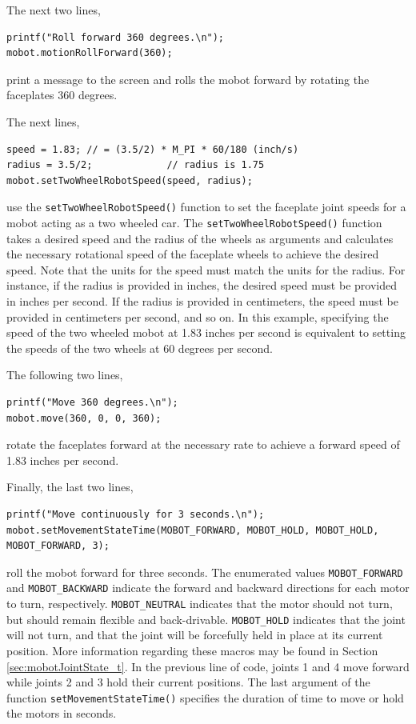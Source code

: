 \documentclass{article}
\begin{document}
The next two lines,
\begin{verbatim}
printf("Roll forward 360 degrees.\n");
mobot.motionRollForward(360);
\end{verbatim}
print a message to the screen and rolls the mobot forward by rotating the faceplates
360 degrees.

The next lines,
\begin{verbatim}
speed = 1.83; // = (3.5/2) * M_PI * 60/180 (inch/s)
radius = 3.5/2;             // radius is 1.75 
mobot.setTwoWheelRobotSpeed(speed, radius);
\end{verbatim}
use the \texttt{setTwoWheelRobotSpeed()} function to set the faceplate joint
speeds for a mobot acting as a two wheeled car. The
\texttt{setTwoWheelRobotSpeed()} function takes a desired speed
and the radius of the wheels as arguments and calculates the necessary
rotational speed of the faceplate wheels to achieve the desired speed. Note
that the units for the speed must match the units for the radius. For instance,
if the radius is provided in inches, the desired speed must be provided in 
inches per second. If the radius is provided in centimeters, the speed must
be provided in centimeters per second, and so on. In this example, specifying 
the speed of the two wheeled mobot at 1.83 inches per second is equivalent to setting
the speeds of the two wheels at 60 degrees per second.

The following two lines,
\begin{verbatim}
printf("Move 360 degrees.\n");
mobot.move(360, 0, 0, 360);
\end{verbatim}
rotate the faceplates forward at the necessary rate to achieve a forward speed of
1.83 inches per second.

Finally, the last two lines,
\begin{verbatim}
printf("Move continuously for 3 seconds.\n");
mobot.setMovementStateTime(MOBOT_FORWARD, MOBOT_HOLD, MOBOT_HOLD, MOBOT_FORWARD, 3);
\end{verbatim}
roll the mobot forward for three seconds.
The enumerated values \texttt{MOBOT\_FORWARD} and \texttt{MOBOT\_BACKWARD}
indicate the forward and backward directions for each motor to turn, respectively. 
\texttt{MOBOT\_NEUTRAL} indicates that the motor should not turn, but
should remain flexible and back-drivable. \texttt{MOBOT\_HOLD}
indicates that the joint will not turn, and that the joint will be 
forcefully held in place at its current position. More information regarding these
macros may be found in Section \ref{sec:mobotJointState_t}. In the previous
line of code, joints 1 and 4 
move forward while joints 2 and 3 hold their current positions. The
last argument  of the function \texttt{setMovementStateTime()} specifies the
duration of time to move or hold the motors in seconds.
\end{document}
